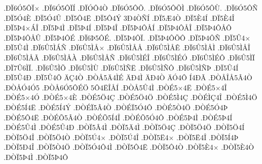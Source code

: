 {.^^d0^^cf6^^d35^^d4^^cf^^d7
.^^d0^^cf6^^d35^^d4^^cf^^cd
.^^d0^^cf^^d3^^d44^^d2
.^^d0^^cf6^^d35^^d4^^d5.
.^^d0^^cf6^^d35^^d4^^d5^^cc
.^^d0^^cf6^^d35^^d4^^d9.
.^^d0^^cf6^^d35^^d4^^d1
.^^d0^^cf5^^d34^^c8
.^^d0^^cf5^^d34^^db
.^^d0^^cf5^^d44^^cb
.^^d0^^cf5^^d44^^dd
3^^d04^^d2^^d1^^cd
.^^d0^^cf5^^c64^^d2
.^^d0^^cf5^^c84^^cd
.^^d0^^cf5^^c84^^ce
.^^d0^^cf5^^de4^^d7^^c1^^ce
.^^d0^^cf5^^de4^^cc
.^^d0^^cf5^^de4^^cd
.^^d0^^cf5^^de4^^ce
.^^d0^^cf5^^de4^^d4^^c5^^cd
.^^d0^^cf5^^de4^^d4^^c5^^ce
.^^d0^^cf5^^de4^^d4^^c5^^d4
.^^d0^^cf5^^de4^^d4^^c5^^db
.^^d0^^cf5^^de4^^d4^^c9
.^^d0^^cf6^^de5^^d4^^c9.
.^^d0^^cf5^^de4^^d4^^cf.
.^^d0^^cf5^^de4^^d4^^d5^^d4
.^^d0^^cf5^^de4^^d4^^d1
.^^d0^^cf5^^db4^^d7
.^^d0^^cf5^^db4^^cc
.^^d0^^cf6^^db5^^cc^^c1^^d1
.^^d0^^cf6^^db5^^cc^^c5^^d7
.^^d0^^cf6^^db5^^cc^^c5^^c5
.^^d0^^cf6^^db5^^cc^^c5^^ca
.^^d0^^cf6^^db5^^cc^^c5^^cc
.^^d0^^cf6^^db5^^cc^^c5^^ce
.^^d0^^cf6^^db5^^cc^^c5^^c3
.^^d0^^cf6^^db5^^cc^^c5^^c0
.^^d0^^cf6^^db5^^cc^^c5^^d1
.^^d0^^cf6^^db5^^cc^^c9^^ce
.^^d0^^cf6^^db5^^cc^^c9^^d3
.^^d0^^cf6^^db5^^cc^^c9^^d4
.^^d0^^cf6^^db5^^cc^^cf
.^^d0^^cf7^^db6^^cc^^cf.
.^^d0^^cf6^^db5^^cc^^d5
.^^d0^^cf6^^db5^^cc^^d9
.^^d0^^cf6^^db5^^cc^^d1^^cb
.^^d0^^cf6^^db5^^cc^^d1^^d4
.^^d0^^cf6^^db5^^cc^^d1^^de
.^^d0^^cf5^^db4^^cd
.^^d0^^cf5^^db4^^d0
.^^d0^^cf5^^db4^^d4
^^c4^^c74^^d2
.^^d0^^d2^^c55^^c44^^cc^^c9
^^c4^^d04^^cc
^^c4^^d04^^d2
^^c4^^d34^^d4
^^cd4^^d0^^c3
.^^d0^^d2^^c5^^ce^^c55^^c24^^d2
.^^d0^^d2^^c5^^d34^^d35
.^^d0^^d2^^c56^^d35^^d4^^c9^^d6
5^^d44^^cb^^ce^^c5^^cd
.^^d0^^d2^^c55^^db4^^cc
.^^d0^^d2^^c95^^d74^^cb
.^^d0^^d2^^c95^^d74^^ce
.^^d0^^d2^^c95^^d74^^d3
.^^d0^^d2^^c95^^d74^^c8
.^^d0^^d2^^c95^^d64^^c7
.^^d0^^d2^^c95^^d64^^d6
.^^d0^^d2^^c95^^cc4^^c7
.^^d0^^d2^^c9^^cc^^c74^^ce
.^^d0^^d2^^c95^^cc4^^d6
.^^d0^^d2^^c95^^cd4^^cb
.^^d0^^d2^^c95^^cd4^^dd
.^^d0^^d2^^c9^^cf5^^c24^^d2
.^^d0^^d2^^c9^^cf5^^d34^^d4
.^^d0^^d2^^c95^^d24^^d6
.^^d0^^d2^^c95^^d34^^de
.^^d0^^d2^^c95^^d44^^cb
.^^d0^^d2^^c9^^d55^^c24^^d2
.^^d0^^d2^^c9^^d55^^cd4^^ce
.^^d0^^d2^^c9^^d55^^d34^^d4
.^^d0^^d2^^c95^^de4^^cc
.^^d0^^d2^^c95^^de4^^cd
.^^d0^^d2^^c95^^db4^^cc
.^^d0^^d2^^c95^^db4^^d0
.^^d0^^d2^^cf5^^c24^^cc
.^^d0^^d2^^cf5^^c44^^cc
.^^d0^^d2^^cf5^^d64^^c7
.^^d0^^d2^^cf5^^d64^^d6
.^^d0^^d2^^cf5^^d64^^cd
.^^d0^^d2^^cf5^^d64^^ce
.^^d0^^d2^^cf5^^d64^^d2
.^^d0^^d2^^cf5^^da4^^d7
.^^d0^^d2^^cf5^^da4^^ce
.^^d0^^d2^^cf5^^cb4^^d7
.^^d0^^d2^^cf5^^cb4^^ce
.^^d0^^d2^^cf5^^cd4^^de
.^^d0^^d2^^cf5^^d04^^ce
.^^d0^^d2^^cf5^^d24^^d6
.^^d0^^d2^^cf5^^d34^^d44^^cc
.^^d0^^d2^^cf5^^d44^^cb
.^^d0^^d2^^cf5^^d44^^d2
.^^d0^^d2^^cf5^^c84^^d7
.^^d0^^d2^^cf5^^c84^^d2
.^^d0^^d2^^cf5^^de4^^cc
.^^d0^^d2^^cf5^^de4^^d4
}
